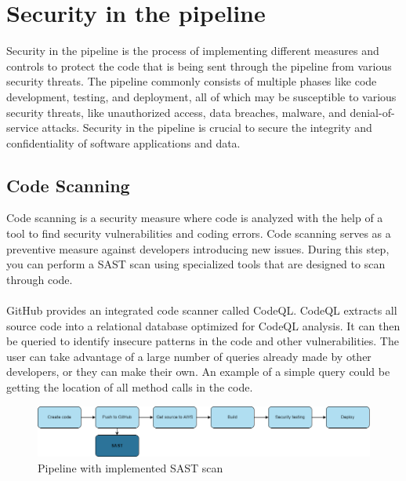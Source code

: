 \section{Security in the pipeline}
Security in the pipeline is the process of implementing different measures and controls to protect the code that is being sent through the pipeline from various security threats. The pipeline commonly consists of multiple phases like code development, testing, and deployment, all of which may be susceptible to various security threats, like unauthorized access, data breaches, malware, and denial-of-service attacks. Security in the pipeline is crucial to secure the integrity and confidentiality of software applications and data.

\subsection{Code Scanning}
Code scanning is a security measure where code is analyzed with the help of a tool to find security vulnerabilities and coding errors. Code scanning serves as a preventive measure against developers introducing new issues. During this step, you can perform a SAST scan using specialized tools that are designed to scan through code. 
\\
\\
GitHub provides an integrated code scanner called CodeQL. CodeQL extracts all source code into a relational database optimized for CodeQL analysis.  It can then be queried to identify insecure patterns in the code and other vulnerabilities. The user can take advantage of a large number of queries already made by other developers, or they can make their own. An example of a simple query could be getting the location of all method calls in the code. 
 \cite{codeql}

 \vspace{2mm}
\begin{figure}[H]
    \centering
    \includegraphics[width=0.8\columnwidth]{Images/pipeline2.png}
    \caption{Pipeline with implemented SAST scan}
    \label{fig: Pipeline with implemented SAST scan}
\end{figure}

